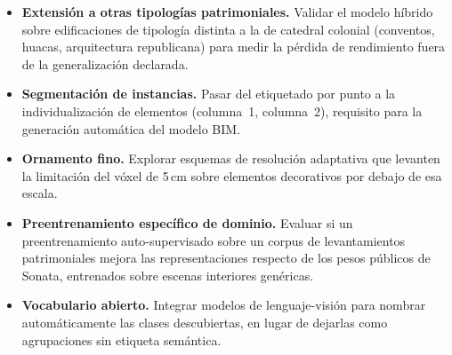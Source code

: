 
\begin{itemize}
\item \textbf{Extensión a otras tipologías patrimoniales.} Validar el modelo
híbrido sobre edificaciones de tipología distinta a la de catedral colonial
(conventos, huacas, arquitectura republicana) para medir la pérdida de
rendimiento fuera de la generalización declarada.

\item \textbf{Segmentación de instancias.} Pasar del etiquetado por punto a la
individualización de elementos (columna~1, columna~2), requisito para la
generación automática del modelo BIM.

\item \textbf{Ornamento fino.} Explorar esquemas de resolución adaptativa que
levanten la limitación del vóxel de 5\,cm sobre elementos decorativos por debajo
de esa escala.

\item \textbf{Preentrenamiento específico de dominio.} Evaluar si un
preentrenamiento auto-supervisado sobre un corpus de levantamientos
patrimoniales mejora las representaciones respecto de los pesos públicos de
Sonata, entrenados sobre escenas interiores genéricas.

\item \textbf{Vocabulario abierto.} Integrar modelos de lenguaje-visión para
nombrar automáticamente las clases descubiertas, en lugar de dejarlas como
agrupaciones sin etiqueta semántica.
\end{itemize}

